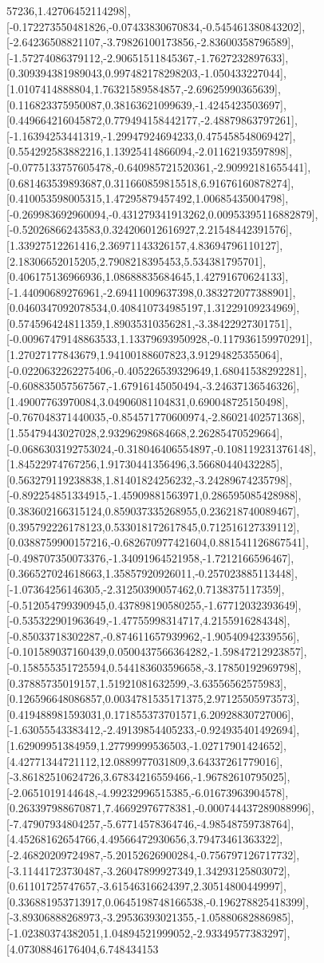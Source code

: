\documentclass{article}
\begin{document}
57236,1.42706452114298],[-0.172273550481826,-0.07433830670834,-0.545461380843202],[-2.64236508821107,-3.79826100173856,-2.83600358796589],[-1.57274086379112,-2.90651511845367,-1.7627232897633],[0.309394381989043,0.997482178298203,-1.050433227044],[1.0107414888804,1.76321589584857,-2.69625990365639],[0.116823375950087,0.38163621099639,-1.4245423503697],[0.449664216045872,0.779494158442177,-2.48879863797261],[-1.16394253441319,-1.29947924694233,0.475458548069427],[0.554292583882216,1.13925414866094,-2.01162193597898],[-0.0775133757605478,-0.640985721520361,-2.90992181655441],[0.681463539893687,0.311660859815518,6.91676160878274],[0.410053598005315,1.47295879457492,1.00685435004798],[-0.269983692960094,-0.431279341913262,0.00953395116882879],[-0.52026866243583,0.324206012616927,2.21548442391576],[1.33927512261416,2.36971143326157,4.83694796110127],[2.18306652015205,2.7908218395453,5.534381795701],[0.406175136966936,1.08688835684645,1.42791670624133],[-1.44090689276961,-2.69411009637398,0.383272077388901],[0.0460347092078534,0.408410734985197,1.31229109234969],[0.574596424811359,1.89035310356281,-3.38422927301751],[-0.00967479148863533,1.13379693950928,-0.117936159970291],[1.27027177843679,1.94100188607823,3.91294825355064],[-0.0220632262275406,-0.405226539329649,1.68041538292281],[-0.608835057567567,-1.67916145050494,-3.24637136546326],[1.49007763970084,3.04906081104831,0.690048725150498],[-0.767048371440035,-0.854571770600974,-2.86021402571368],[1.55479443027028,2.93296298684668,2.26285470529664],[-0.0686303192753024,-0.318046406554897,-0.108119231376148],[1.84522974767256,1.91730441356496,3.56680440432285],[0.563279119238838,1.81401824256232,-3.24289674235798],[-0.892254851334915,-1.45909881563971,0.286595085428988],[0.383602166315124,0.859037335268955,0.236218740089467],[0.395792226178123,0.533018172617845,0.712516127339112],[0.0388759900157216,-0.682670977421604,0.881541126867541],[-0.498707350073376,-1.34091964521958,-1.7212166596467],[0.366527024618663,1.35857920926011,-0.257023885113448],[-1.07364256146305,-2.31250390057462,0.7138375117359],[-0.512054799390945,0.437898190580255,-1.67712032393649],[-0.535322901963649,-1.47755998314717,4.2155916284348],[-0.85033718302287,-0.874611657939962,-1.90540942339556],[-0.101589037160439,0.0500437566364282,-1.59847212923857],[-0.158555351725594,0.544183603596658,-3.17850192969798],[0.37885735019157,1.51921081632599,-3.63556562575983],[0.126596648086857,0.0034781535171375,2.97125505973573],[0.419488981593031,0.171855373701571,6.20928830727006],[-1.63055543383412,-2.49139854405233,-0.924935401492694],[1.62909951384959,1.27799999536503,-1.02717901424652],[4.42771344721112,12.0889977031809,3.64337261779016],[-3.86182510624726,3.67834216559466,-1.96782610795025],[-2.0651019144648,-4.99232996515385,-6.01673963904578],[0.263397988670871,7.46692976778381,-0.000744437289088996],[-7.47907934804257,-5.67714578364746,-4.98548759738764],[4.45268162654766,4.49566472930656,3.79473461363322],[-2.46820209724987,-5.20152626900284,-0.756797126717732],[-3.11441723730487,-3.26047899927349,1.34293125803072],[0.61101725747657,-3.61546316624397,2.30514800449997],[0.336881953713917,0.0645198748166538,-0.196278825418399],[-3.89306888268973,-3.29536393021355,-1.05880682886985],[-1.02380374382051,1.04894521999052,-2.93349577383297],[4.07308846176404,6.748434153
\end{document}
